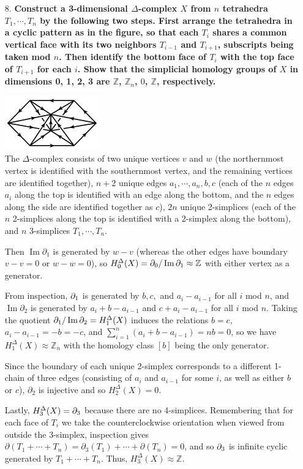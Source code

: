 \documentclass[a4paper,12pt]{article}
\DeclareMathOperator{\im}{Im}
\let\ker\relax %
\DeclareMathOperator{\ker}{Ker}
\begin{document}
\begin{enumerate}
    \item[8.]
        \boldmath\textbf{Construct a 3-dimensional $\Delta$-complex $X$ from $n$ tetrahedra $T_1, \cdots, T_n$ by the following two steps. First arrange the tetrahedra in a cyclic pattern as in the figure, so that each $T_i$ shares a common vertical face with its two neighbors $T_{i - 1}$ and $T_{i + 1}$, subscripts being taken mod $n$. Then identify the bottom face of $T_i$ with the top face of $T_{i + 1}$ for each $i$. Show that the simplicial homology groups of $X$ in dimensions 0, 1, 2, 3 are $\mathbb{Z}$, $\mathbb{Z}_n$, $0$, $\mathbb{Z}$, respectively.
        }\unboldmath \par
        {\centering
            \includegraphics[scale=1]{hw5_8}
        \\}
        The $\Delta$-complex consists of two unique vertices $v$ and $w$ (the northernmost vertex is identified with the southernmost vertex, and the remaining vertices are identified together), $n + 2$ unique edges $a_1, \cdots, a_n, b, c$ (each of the $n$ edges $a_i$ along the top is identified with an edge along the bottom, and the $n$ edges along the side are identified together as $c$), $2n$ unique 2-simplices (each of the $n$ 2-simplices along the top is identified with a 2-simplex along the bottom), and $n$ 3-simplices $T_1, \cdots, T_n$. \par
        Then $\im\partial_1$ is generated by $w - v$ (whereas the other edges have boundary $v - v = 0$ or $w - w = 0$), so $H_0^\Delta(X) = \ker\partial_0 / \im\partial_1 \approx \mathbb{Z}$ with either vertex as a generator. \par
        From inspection, $\ker\partial_1$ is generated by $b, c,$ and $a_i - a_{i - 1}$ for all $i$ mod $n$, and $\im\partial_2$ is generated by $a_i + b - a_{i - 1}$ and $c + a_i - a_{i - 1}$ for all $i$ mod $n$. Taking the quotient $\ker\partial_1 / \im\partial_2 = H_1^\Delta(X)$ induces the relations $b = c$, $a_i - a_{i - 1} = -b = -c$, and $\sum_{i = 1}^n (a_i + b - a_{i - 1}) = nb = 0$, so we have $H_1^\Delta(X) \approx \mathbb{Z}_n$ with the homology class $[b]$ being the only generator. \par
        Since the boundary of each unique 2-simplex corresponds to a different 1-chain of three edges (consisting of $a_i$ and $a_{i - 1}$ for some $i$, as well as either $b$ or $c$), $\partial_2$ is injective and so $H_2^\Delta(X) = 0$. \par
        Lastly, $H_3^\Delta(X) = \ker\partial_3$ because there are no 4-simplices. Remembering that for each face of $T_i$ we take the counterclockwise orientation when viewed from outside the 3-simplex, inspection gives $\partial(T_1 + \cdots + T_n) = \partial_3(T_1) + \cdots + \partial(T_n) = 0$, and so $\ker\partial_3$ is infinite cyclic generated by $T_1 + \cdots + T_n$. Thus, $H_3^\Delta(X) \approx \mathbb{Z}$.


\end{enumerate}
\end{document}

